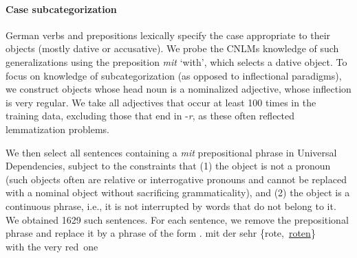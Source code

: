 %
%

\paragraph{Case subcategorization}
German verbs and prepositions lexically specify the case appropriate
to their objects (mostly dative or accusative).  We probe the CNLMs
knowledge of such generalizations using the preposition \textit{mit}
`with', which selects a dative object. To focus on knowledge of
subcategorization (as opposed to inflectional paradigms), we construct
objects whose head noun is a nominalized adjective, whose inflection
is very regular.  We take all adjectives that occur at least 100 times
in the training data, excluding those that end in -\emph{r}, as these
often reflected lemmatization problems.

We then select all sentences containing a \emph{mit} prepositional phrase in Universal Dependencies, subject to the constraints that (1) the object is not a pronoun (such objects often are relative or interrogative pronouns and cannot be replaced with a nominal object without sacrificing grammaticality), and (2) the object is a continuous phrase, i.e., it is not interrupted by words that do not belong to it. %
We obtained 1629 such sentences.
For each sentence, we remove the prepositional phrase and replace it by a phrase of the form
\exg. mit der sehr \{rote,\ \underline{roten}\} \\
with the very red\ one \\

